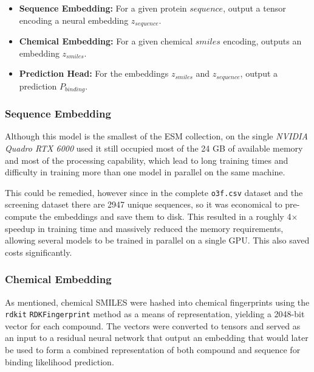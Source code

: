 \documentclass{article}
\begin{document}
\begin{itemize}
	\item \textbf{Sequence Embedding:} For a given protein $sequence$, output a tensor encoding a neural embedding $z_{sequence}$.
	\item \textbf{Chemical Embedding:} For a given chemical $smiles$ encoding, outputs an embedding $z_{smiles}$.
	\item \textbf{Prediction Head:} For the embeddings $z_{smiles}$ and $z_{sequence}$, output a prediction $P_{binding}$.
\end{itemize}


\subsubsection{Sequence Embedding}


Although this model is the smallest of the ESM collection, on the single \textit{NVIDIA Quadro RTX 6000} used it still occupied most of the 24 GB of available memory and most of the processing capability, which lead to long training times and difficulty in training more than one model in parallel on the same machine.

This could be remedied, however since in the complete \texttt{o3f.csv} dataset and the screening dataset there are 2947 unique sequences, so it was economical to pre-compute the embeddings and save them to disk.
This resulted in a roughly 4$\times$ speedup in training time and massively reduced the memory requirements, allowing several models to be trained in parallel on a single GPU.
This also saved costs significantly.

\subsubsection{Chemical Embedding}

As mentioned, chemical SMILES were hashed into chemical fingerprints using the \texttt{rdkit} \texttt{RDKFingerprint} method as a means of representation, yielding a 2048-bit vector for each compound.
The vectors were converted to tensors and served as an input to a residual neural network that output an embedding that would later be used to form a combined representation of both compound and sequence for binding likelihood prediction.
\end{document}

